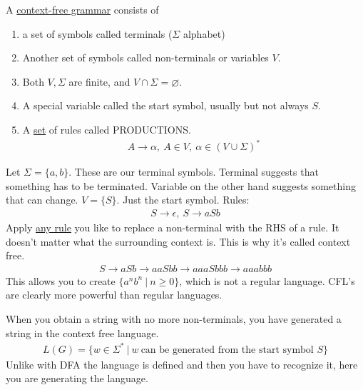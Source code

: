 \documentclass[../598comp.tex]{subfiles}
\begin{document}
\begin{definition}
  A \ul{context-free grammar} consists of
  \begin{enumerate}
  \item 
    a set of symbols called terminals ($\Sigma$ alphabet)
  \item
    Another set of symbols called non-terminals or variables $V$.
  \item
    Both $V, \Sigma$ are finite, and $V \cap \Sigma = \varnothing$.
  \item
    A special variable called the start symbol, usually but not always $S$.
  \item
    A \ul{set} of rules called PRODUCTIONS.
    \begin{gather*}
      A \to \alpha, \ A \in V, \ \alpha \in (V \cup \Sigma)^*
    \end{gather*}
  \end{enumerate}
\end{definition}
\begin{example}
  Let $\Sigma = \{a, b\}$. These are our terminal symbols. Terminal suggests
  that something has to be terminated. Variable on the other hand suggests
  something that can change. $V = \{S\}$. Just the start symbol. Rules:
  \begin{gather*}
    S \to \epsilon, \ S \to aSb
  \end{gather*}
  Apply \ul{any rule} you like to replace a non-terminal with the RHS of a rule.
  It doesn't matter what the surrounding context is. This is why it's called
  context free.
  \begin{gather*}
    S \to aSb \to aaSbb \to aaaSbbb \to aaabbb
  \end{gather*}
  This allows you to create $\{a^nb^n \ | \ n \geq 0\}$, which is not a regular
  language. CFL's are clearly more powerful than regular languages.

  When you obtain a string with no more non-terminals, you have generated a
  string in the context free language.
  \begin{gather*}
    L(G) = \{w \in \Sigma^* \ | \ w \ \text{can be generated from the start
      symbol $S$}\}
  \end{gather*}
  Unlike with DFA the language is defined and then you have to recognize it,
  here you are generating the language.
\end{example}
\end{document}
